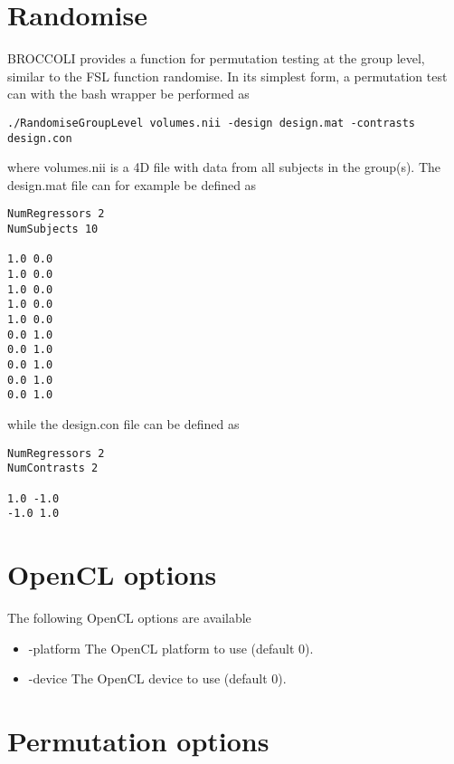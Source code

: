 \section{Randomise}

BROCCOLI provides a function for permutation testing at the group level, similar to the FSL function randomise. In its simplest form, a permutation test can with the bash wrapper be performed as

\begin{verbatim}
./RandomiseGroupLevel volumes.nii -design design.mat -contrasts design.con 
\end{verbatim}

where volumes.nii is a 4D file with data from all subjects in the group(s). The design.mat file can for example be defined as

\begin{verbatim}
NumRegressors 2
NumSubjects 10

1.0 0.0
1.0 0.0
1.0 0.0
1.0 0.0
1.0 0.0
0.0 1.0
0.0 1.0
0.0 1.0
0.0 1.0
0.0 1.0
\end{verbatim}

while the design.con file can be defined as

\begin{verbatim}
NumRegressors 2
NumContrasts 2

1.0 -1.0
-1.0 1.0
\end{verbatim}


\section{OpenCL options}

The following OpenCL options are available

\begin{itemize}

\item -platform
\newline \newline The OpenCL platform to use (default 0).

\item -device
\newline \newline The OpenCL device to use (default 0).

\end{itemize}

\section{Permutation options}

